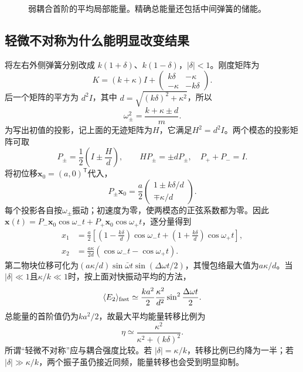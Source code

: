 \documentclass[11pt,openany,fontset=fandol]{ctexbook}
\theoremstyle{plain}\newtheorem{theorem}{定理}[chapter]\newtheorem{proposition}[theorem]{命题}
\theoremstyle{definition}\newtheorem{definition}{定义}[chapter]\newtheorem{example}{例}[chapter]
\theoremstyle{remark}\newtheorem*{remark}{说明}
\newcommand{\vct}[1]{\bm{#1}}\newcommand{\Rea}{\operatorname{Re}}\newcommand{\Ima}{\operatorname{Im}}
\begin{document}
\begin{figure}[htbp]\centering
{}
\caption{弱耦合首阶的平均局部能量。精确总能量还包括中间弹簧的储能。}
\label{fig:orig-066}
\end{figure}

\subsection{轻微不对称为什么能明显改变结果}
将左右外侧弹簧分别改成 $k(1+\delta)$、$k(1-\delta)$，$|\delta|<1$。刚度矩阵为
\[
K=(k+\kappa)I+\begin{pmatrix}k\delta&-\kappa\\-\kappa&-k\delta\end{pmatrix}.
\]
后一个矩阵的平方为 $d^2I$，其中 $d=\sqrt{(k\delta)^2+\kappa^2}$，所以
\begin{equation}\label{eq:detuned-frequencies}
\omega_\pm^2=\frac{k+\kappa\pm d}{m}.
\end{equation}
为写出初值的投影，记上面的无迹矩阵为$H$，它满足$H^2=d^2I$。两个模态的投影矩阵可取
\[P_\pm=\frac12\left(I\pm\frac Hd\right),\qquad
HP_\pm=\pm dP_\pm,\quad P_++P_-=I.\]
将初位移$\vct x_0=(a,0)^{\mathsf T}$代入，
\[P_\pm\vct x_0
=\frac a2\begin{pmatrix}1\pm k\delta/d\\\mp\kappa/d\end{pmatrix}.\]
每个投影各自按$\omega_\pm$振动；初速度为零，使两模态的正弦系数都为零。因此
$\vct x(t)=P_-\vct x_0\cos\omega_-t+P_+\vct x_0\cos\omega_+t$，逐分量得到
\begin{align}
x_1&=\frac a2\left[\left(1-\frac{k\delta}{d}\right)\cos\omega_-t+
\left(1+\frac{k\delta}{d}\right)\cos\omega_+t\right],\\
x_2&=\frac{a\kappa}{2d}(\cos\omega_-t-\cos\omega_+t).
\end{align}
第二物块位移可化为$(a\kappa/d)\sin\bar\omega t\sin(\Delta\omega t/2)$，其慢包络最大值为$a\kappa/d$。当$|\delta|\ll1$且$\kappa/k\ll1$时，按上面对快振动平均的方法，
\[\langle E_2\rangle_{\rm fast}
\simeq\frac{ka^2}{2}\frac{\kappa^2}{d^2}
\sin^2\frac{\Delta\omega t}{2}.\]
总能量的首阶值仍为$ka^2/2$，故最大平均能量转移比例为
\begin{equation}\label{eq:transfer-fraction}
\eta\simeq\frac{\kappa^2}{\kappa^2+(k\delta)^2}.
\end{equation}
所谓“轻微不对称”应与耦合强度比较。若 $|\delta|=\kappa/k$，转移比例已约降为一半；若 $|\delta|\gg\kappa/k$，两个振子虽仍接近同频，能量转移也会受到明显抑制。
\end{document}
